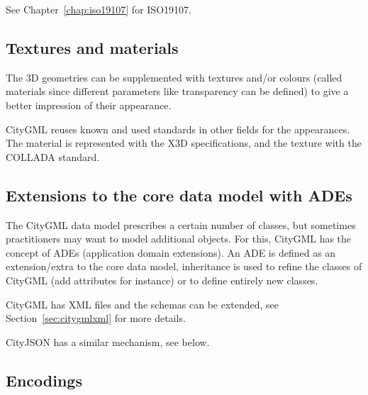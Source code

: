 See Chapter~\ref{chap:iso19107} for ISO19107.


\subsection{Textures and materials}
The 3D geometries can be supplemented with textures and/or colours (called materials since different parameters like transparency can be defined) to give a better impression of their appearance.

CityGML reuses known and used standards in other fields for the appearances.
The material is represented with the X3D specifications, and the texture with the COLLADA standard.


\subsection{Extensions to the core data model with ADEs} 

The CityGML data model prescribes a certain number of classes, but sometimes practitioners may want to model additional objects.
For this, CityGML has the concept of ADEs (application domain extensions).
An ADE is defined as an extension/extra to the core data model, inheritance is used to refine the classes of CityGML (add attributes for instance) or to define entirely new classes.

CityGML has XML files and the schemas can be extended, see Section~\ref{sec:citygmlxml} for more details. 

CityJSON has a similar mechanism, see below.








\subsection{Encodings}

